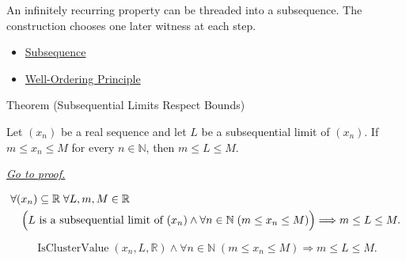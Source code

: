 \begin{remark*}[Interpretation]
An infinitely recurring property can be threaded into a subsequence. The
construction chooses one later witness at each step.
\end{remark*}

\begin{dependencies}
\begin{itemize}
  \item \hyperref[def:subsequence-of-sequence]{Subsequence}
  \item \hyperref[thm:well-ordering-principle]{Well-Ordering Principle}
\end{itemize}
\end{dependencies}


\begin{theorembox}{Theorem (Subsequential Limits Respect Bounds)}
\begin{theorem}
\label{thm:subsequential-limits-respect-bounds}
Let $(x_n)$ be a real sequence and let $L$ be a subsequential limit of
$(x_n)$. If $m\le x_n\le M$ for every $n\in\mathbb{N}$, then
$m\le L\le M$.

\smallskip
\noindent
\hyperref[prf:subsequential-limits-respect-bounds]{\textit{Go to proof.}}
\end{theorem}
\end{theorembox}

\begin{remark*}
\[
\begin{aligned}
&\forall (x_n)\subseteq\mathbb{R}\;\forall L,m,M\in\mathbb{R}\\
&\quad\Bigl(
  L\text{ is a subsequential limit of }(x_n)
  \land
  \forall n\in\mathbb{N}\;(m\le x_n\le M)
\Bigr)
\Longrightarrow
m\le L\le M.
\end{aligned}
\]
\end{remark*}

\begin{remark*}
\[
\operatorname{IsClusterValue}(x_n,L,\mathbb{R})
\land
\forall n\in\mathbb{N}\;(m\le x_n\le M)
\Longrightarrow
m\le L\le M.
\]
\end{remark*}

